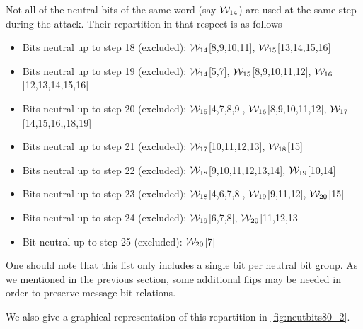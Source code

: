 Not all of the neutral bits of the same word (say $\mathcal{W}_{14}$) are used at the same step during the attack. Their repartition
in that respect is as follows
\begin{itemize}
	\item Bits neutral up to step 18 (excluded): $\mathcal{W}_{14}$[8,9,10,11], $\mathcal{W}_{15}$[13,14,15,16]
	\item Bits neutral up to step 19 (excluded): $\mathcal{W}_{14}$[5,7], $\mathcal{W}_{15}$[8,9,10,11,12], $\mathcal{W}_{16}$[12,13,14,15,16]
	\item Bits neutral up to step 20 (excluded): $\mathcal{W}_{15}$[4,7,8,9], $\mathcal{W}_{16}$[8,9,10,11,12], $\mathcal{W}_{17}$[14,15,16,,18,19]
	\item Bits neutral up to step 21 (excluded): $\mathcal{W}_{17}$[10,11,12,13], $\mathcal{W}_{18}$[15]
	\item Bits neutral up to step 22 (excluded): $\mathcal{W}_{18}$[9,10,11,12,13,14], $\mathcal{W}_{19}$[10,14]
	\item Bits neutral up to step 23 (excluded): $\mathcal{W}_{18}$[4,6,7,8], $\mathcal{W}_{19}$[9,11,12], $\mathcal{W}_{20}$[15]
	\item Bits neutral up to step 24 (excluded): $\mathcal{W}_{19}$[6,7,8], $\mathcal{W}_{20}$[11,12,13]
	\item Bit neutral up to step 25 (excluded): $\mathcal{W}_{20}$[7]
\end{itemize}
One should note that this list only includes a single bit per neutral bit group. As we mentioned in the previous section, some
additional flips may be needed in order to preserve message bit relations.

We also give a graphical representation of this repartition in \autoref{fig:neutbits80_2}.

